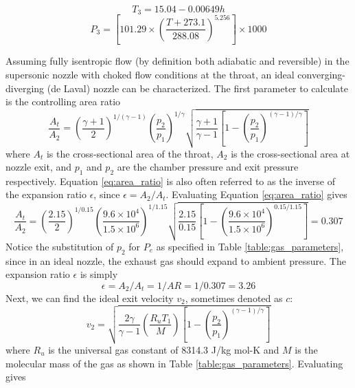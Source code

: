 \documentclass[9pt]{article} %
\numberwithin{equation}{section} %
\begin{document}
\begin{equation} \label{eq:ambient_temperature}
T_{3} = 15.04 - 0.00649 h 
\end{equation}
\begin{equation} \label{eq:ambient_pressure}
P_{3} = \left[101.29 \times \left( \frac{T + 273.1}{288.08} \right) ^ {5.256} \right] \times 1000
\end{equation}

Assuming fully isentropic flow (by definition both adiabatic and reversible) in the supersonic nozzle with choked flow conditions at the throat, an ideal converging-diverging (de Laval) nozzle can be characterized. The first parameter to calculate is the controlling area ratio
\begin{equation} \label{eq:area_ratio}
\frac{A_{t}}{A_{2}} = \left( \frac{\gamma + 1}{2} \right) ^{1/(\gamma - 1)} \left( \frac{p_{2}}{p_{1}} \right) ^{1/\gamma} \sqrt{ \frac{\gamma + 1}{\gamma - 1} \left[ 1 - \left( \frac{p_{2}}{p_{1}} \right) ^{(\gamma - 1)/\gamma} \right] }
\end{equation}
where $A_{t}$ is the cross-sectional area of the throat, $A_{2}$ is the cross-sectional area at nozzle exit, and $p_{1}$ and $p_{2}$ are the chamber pressure and exit pressure respectively. Equation \ref{eq:area_ratio} is also often referred to as the inverse of the expansion ratio $\epsilon$, since $\epsilon = A_{2}/A_{t}$. Evaluating Equation \ref{eq:area_ratio} gives
\begin{equation*} 
\frac{A_{t}}{A_{2}} = \left( \frac{2.15}{2} \right) ^{1/0.15} \left( \frac{9.6 \times 10^{4}}{1.5 \times 10^{6}} \right) ^{1/1.15} \sqrt{ \frac{2.15}{0.15} \left[ 1 - \left( \frac{9.6 \times 10^{4}}{1.5 \times 10^{6}} \right) ^{0.15/1.15} \right] } = 0.307
\end{equation*}
Notice the substitution of $p_{2}$ for $P_{e}$ as specified in Table \ref{table:gas_parameters}, since in an ideal nozzle, the exhaust gas should expand to ambient pressure. The expansion ratio $\epsilon$ is simply
\begin{equation*}
\epsilon = A_{2}/A_{t} = 1/AR = 1/0.307 = 3.26
\end{equation*}
Next, we can find the ideal exit velocity $v_{2}$, sometimes denoted as $c$:
\begin{equation} \label{eq:exit_velocity}
v_{2} = \sqrt{ \frac{2\gamma}{\gamma - 1} \left( \frac{R_{u}T_{1}}{M} \right) \left[ 1- \left( \frac{p_{2}}{p_{1}} \right) ^{(\gamma - 1)/\gamma} \right] }
\end{equation}
where $R_{u}$ is the universal gas constant of 8314.3 J/kg mol-K and $M$ is the molecular mass of the gas as shown in Table \ref{table:gas_parameters}. Evaluating gives
\end{document}
